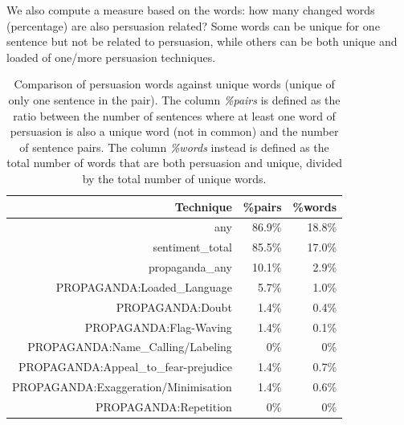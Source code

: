 

We also compute a measure based on the words: how many changed words (percentage) are also persuasion related? Some words can be unique for one sentence but not be related to persuasion, while others can be both unique and loaded of one/more persuasion techniques.

\begin{table}[!htbp]
    \centering
    \begin{tabular}{r|rr}
         Technique & \%pairs & \%words \\
         \hline
         any & 86.9\% & 18.8\% \\
        sentiment\_total & 85.5\% & 17.0\% \\
        propaganda\_any & 10.1\% & 2.9\% \\
        PROPAGANDA:Loaded\_Language & 5.7\% & 1.0\% \\
        PROPAGANDA:Doubt & 1.4\% & 0.4\% \\
        PROPAGANDA:Flag-Waving & 1.4\% & 0.1\% \\
        PROPAGANDA:Name\_Calling/Labeling & 0\% & 0\% \\
        PROPAGANDA:Appeal\_to\_fear-prejudice & 1.4\% & 0.7\% \\
        PROPAGANDA:Exaggeration/Minimisation & 1.4\% & 0.6\% \\
        PROPAGANDA:Repetition & 0\% & 0\% \\
    \end{tabular}
    \caption{Comparison of persuasion words against unique words (unique of only one sentence in the pair). The column \textit{\%pairs} is defined as the ratio between the number of sentences where at least one word of persuasion is also a unique word (not in common) and the number of sentence pairs. The column \textit{\%words} instead is defined as the total number of words that are both persuasion and unique, divided by the total number of unique words.}
    \label{tab:words_persuasion_in_variations}
\end{table}

